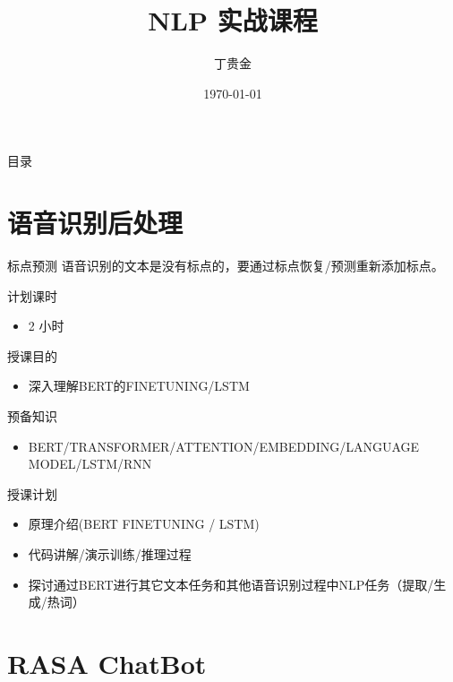 \documentclass[10pt,aspectratio=43,mathserif,table]{beamer}
\title{NLP 实战课程}
\subtitle{\fontsize{9pt}{14pt}\textbf{}}
\author{丁贵金}
\institute{\fontsize{8pt}{14pt}草稿}
\date{\today}
\begin{document}

\frame{\titlepage}

\section[目录]{}   %
\begin{frame}{目录}
\tableofcontents
\end{frame}



\section{语音识别后处理} 

\begin{frame}{标点预测}
	语音识别的文本是没有标点的，要通过标点恢复/预测重新添加标点。
\begin{block}{}
	计划课时
	\begin{itemize}
		\item<0-> 2 小时
	\end{itemize}

	授课目的
	\begin{itemize}
		\item<0-> 深入理解BERT的FINETUNING/LSTM
	\end{itemize}

	预备知识
	\begin{itemize}
		\item<0-> BERT/TRANSFORMER/ATTENTION/EMBEDDING/LANGUAGE MODEL/LSTM/RNN
	\end{itemize}

	授课计划
	\begin{itemize}
		\item<0-> 原理介绍(BERT FINETUNING / LSTM)
		\item<0-> 代码讲解/演示训练/推理过程
		\item<0-> 探讨通过BERT进行其它文本任务和其他语音识别过程中NLP任务（提取/生成/热词）
	\end{itemize}

\end{block}
\end{frame}


\section{RASA ChatBot} 
\end{document}
